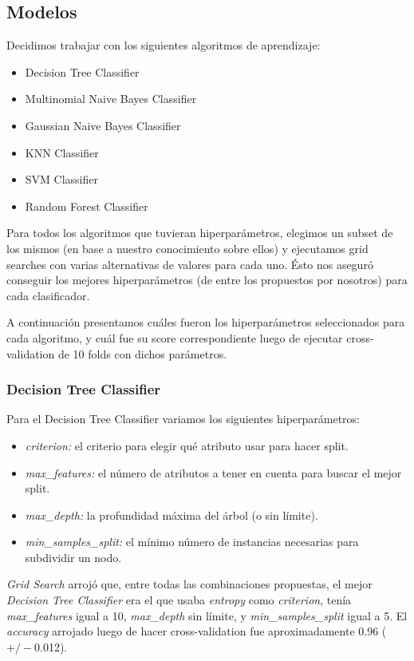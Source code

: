 \documentclass[a4paper]{article}
\begin{document}
\subsection{Modelos}

Decidimos trabajar con los siguientes algoritmos de aprendizaje:

\begin{itemize}
	\item Decision Tree Classifier
	\item Multinomial Naive Bayes Classifier
	\item Gaussian Naive Bayes Classifier
	\item KNN Classifier
	\item SVM Classifier
	\item Random Forest Classifier
\end{itemize}

Para todos los algoritmos que tuvieran hiperparámetros, elegimos un subset de los mismos (en base a nuestro conocimiento sobre ellos) y ejecutamos grid searches con varias alternativas de valores para cada uno. Ésto nos aseguró conseguir los mejores hiperparámetros (de entre los propuestos por nosotros) para cada clasificador. 
\newline

A continuación presentamos cuáles fueron los hiperparámetros seleccionados para cada algoritmo, y cuál fue su score correspondiente luego de ejecutar cross-validation de 10 folds con dichos parámetros.

\subsubsection{Decision Tree Classifier}
Para el Decision Tree Classifier variamos los siguientes hiperparámetros:
\begin{itemize}
	\item \textit{criterion:} el criterio para elegir qué atributo usar para hacer split.
	\item \textit{max\_features:} el número de atributos a tener en cuenta para buscar el mejor split.
	\item \textit{max\_depth:} la profundidad máxima del árbol (o sin límite).
	\item \textit{min\_samples\_split:} el mínimo número de instancias necesarias para subdividir un nodo.
\end{itemize}

\textit{Grid Search} arrojó que, entre todas las combinaciones propuestas, el mejor \textit{Decision Tree Classifier} era el que usaba \textit{entropy} como \textit{criterion}, tenía \textit{max\_features} igual a 10, \textit{max\_depth} sin límite, y \textit{min\_samples\_split} igual a 5. \newline
\indent El \textit{accuracy} arrojado luego de hacer cross-validation fue aproximadamente 0.96 ($+/-$0.012).
\end{document}
